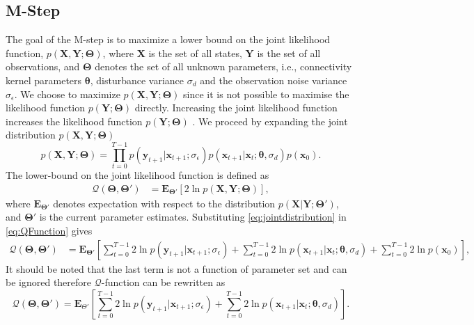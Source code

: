 \documentclass[]{article}
\begin{document}
\subsection{M-Step}
The goal of the M-step is to maximize a lower bound on the joint likelihood function, $p(\mathbf X,\mathbf Y;\boldsymbol \Theta)$, where $\mathbf X$ is the set of all states, $\mathbf Y$ is the set of all observations, and $\boldsymbol \Theta$ denotes the set of all unknown parameters, i.e., connectivity kernel parameters $\boldsymbol\theta$, disturbance variance $\sigma_d$ and the observation noise variance $\sigma_{\epsilon}$. We choose to maximize  $p(\mathbf X,\mathbf Y;\boldsymbol \Theta)$ since it is not  possible to maximise the likelihood function $p(\mathbf Y;\boldsymbol\Theta)$ directly. Increasing the joint likelihood function increases the likelihood function $p(\mathbf Y;\boldsymbol \Theta)$ \cite{McLachlan1997}. We proceed by expanding the joint distribution $p(\mathbf X,\mathbf Y;\boldsymbol \Theta)$
\begin{equation}\label{eq:jointdistribution}
 p(\mathbf X,\mathbf Y;\boldsymbol \Theta)=\prod_{t=0}^{T-1} p(\mathbf y_{t+1}|\mathbf x_{t+1}; \sigma_{\epsilon})p(\mathbf x_{t+1}|\mathbf x_{t};\boldsymbol \theta, \sigma_d)p(\mathbf x_0).
\end{equation}
The  lower-bound on the joint likelihood function is defined as   
\begin{align}\label{eq:QFunction}
 \mathcal Q(\boldsymbol \Theta,\boldsymbol\Theta')&=\mathbf E_{\boldsymbol \Theta'}\left[2\ln p(\mathbf X,\mathbf Y;\boldsymbol \Theta)\right],
\end{align}
where $ \mathbf E_{\boldsymbol \Theta'}$ denotes expectation with respect to the distribution $p(\mathbf X | \mathbf Y;\boldsymbol \Theta')$, and $\boldsymbol \Theta'$ is the current parameter estimates. Substituting  \ref{eq:jointdistribution} in \ref{eq:QFunction} gives
\begin{align}
 \mathcal Q(\boldsymbol \Theta,\boldsymbol\Theta')&=\mathbf E_{\boldsymbol\Theta'}\left[\sum_{t=0}^{T-1}2\ln p(\mathbf y_{t+1}|\mathbf x_{t+1};\sigma_{\epsilon})+\sum_{t=0}^{T-1}2\ln p(\mathbf x_{t+1}|\mathbf x_{t};\boldsymbol \theta, \sigma_d)+\sum_{t=0}^{T-1}2\ln p(\mathbf x_0)\right],
\end{align}
 It should be noted that the last term is not a function of parameter set and can be ignored therefore $\mathcal Q$-function can be rewritten as
\begin{equation}\label{eq:QIntermsofJointDist}
\mathcal Q(\boldsymbol \Theta,\boldsymbol\Theta')=\mathbf E_{\Theta'}\left[\sum_{t=0}^{T-1}2\ln p(\mathbf y_{t+1}|\mathbf x_{t+1}; \sigma_{\epsilon})+\sum_{t=0}^{T-1}2\ln p(\mathbf x_{t+1}|\mathbf x_{t};\boldsymbol \theta ,\sigma_d)\right].
\end{equation}
\end{document}
